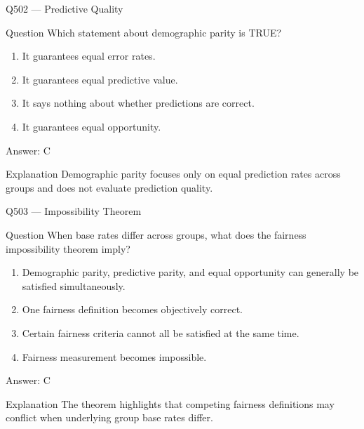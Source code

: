 \documentclass[aspectratio=169,8pt]{beamer}
\begin{document}
\begin{frame}{Q502 --- Predictive Quality}
	\begin{block}{Question}
		Which statement about demographic parity is TRUE?
		\begin{enumerate}
			\item It guarantees equal error rates.
			\item It guarantees equal predictive value.
			\item It says nothing about whether predictions are correct.
			\item It guarantees equal opportunity.
		\end{enumerate}
	\end{block}
	\begin{exampleblock}{Answer: C}\end{exampleblock}
	\begin{block}{Explanation}
		Demographic parity focuses only on equal prediction rates across groups and does not evaluate prediction quality.
	\end{block}
\end{frame}

\begin{frame}{Q503 --- Impossibility Theorem}
	\begin{block}{Question}
		When base rates differ across groups, what does the fairness impossibility theorem imply?
		\begin{enumerate}
			\item Demographic parity, predictive parity, and equal opportunity can generally be satisfied simultaneously.
			\item One fairness definition becomes objectively correct.
			\item Certain fairness criteria cannot all be satisfied at the same time.
			\item Fairness measurement becomes impossible.
		\end{enumerate}
	\end{block}
	\begin{exampleblock}{Answer: C}\end{exampleblock}
	\begin{block}{Explanation}
		The theorem highlights that competing fairness definitions may conflict when underlying group base rates differ.
	\end{block}
\end{frame}
\end{document}
